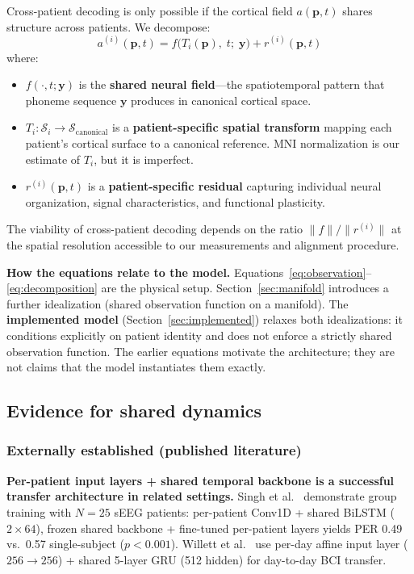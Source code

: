 \documentclass[11pt,letterpaper]{article}
\newcommand{\bfp}{\mathbf{p}}
\newcommand{\bfy}{\mathbf{y}}
\newcommand{\cS}{\mathcal{S}}
\begin{document}
Cross-patient decoding is only possible if the cortical field $a(\bfp, t)$ shares structure across patients. We decompose:
\begin{equation}\label{eq:decomposition}
\boxed{a^{(i)}(\bfp, t) = f\bigl(T_i(\bfp),\; t;\; \bfy\bigr) + r^{(i)}(\bfp, t)}
\end{equation}
where:
\begin{itemize}[leftmargin=2em]
\item $f(\cdot, t; \bfy)$ is the \textbf{shared neural field}---the spatiotemporal pattern that phoneme sequence $\bfy$ produces in canonical cortical space.
\item $T_i: \cS_i \to \cS_{\text{canonical}}$ is a \textbf{patient-specific spatial transform} mapping each patient's cortical surface to a canonical reference. MNI normalization is our estimate of $T_i$, but it is imperfect.
\item $r^{(i)}(\bfp, t)$ is a \textbf{patient-specific residual} capturing individual neural organization, signal characteristics, and functional plasticity.
\end{itemize}
The viability of cross-patient decoding depends on the ratio $\|f\| / \|r^{(i)}\|$ at the spatial resolution accessible to our measurements and alignment procedure.

\textbf{How the equations relate to the model.} Equations~\eqref{eq:observation}--\eqref{eq:decomposition} are the physical setup. Section~\ref{sec:manifold} introduces a further idealization (shared observation function on a manifold). The \textbf{implemented model} (Section~\ref{sec:implemented}) relaxes both idealizations: it conditions explicitly on patient identity and does not enforce a strictly shared observation function. The earlier equations motivate the architecture; they are not claims that the model instantiates them exactly.

\subsection{Evidence for shared dynamics}

\subsubsection{Externally established (published literature)}

\textbf{Per-patient input layers + shared temporal backbone is a successful transfer architecture in related settings.} Singh et al.~\cite{singh2025} demonstrate group training with $N{=}25$ sEEG patients: per-patient Conv1D + shared BiLSTM ($2{\times}64$), frozen shared backbone + fine-tuned per-patient layers yields PER 0.49 vs.\ 0.57 single-subject ($p{<}0.001$). Willett et al.~\cite{willett2023} use per-day affine input layer ($256{\to}256$) + shared 5-layer GRU (512 hidden) for day-to-day BCI transfer.
\end{document}
